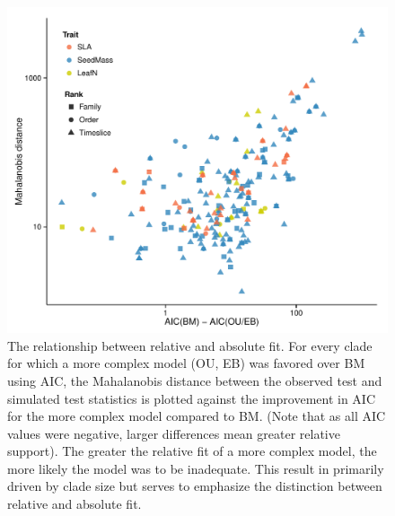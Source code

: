 \documentclass[a4paper,11pt]{article}
\begin{document}
{\begin{figure}[p]
  \centering
  \includegraphics[scale=0.8]{figs/ad-aic}
  \caption{The relationship between relative and absolute fit. For every clade for which a more complex model (OU, EB) was favored over BM using AIC, the Mahalanobis distance between the observed test and simulated test statistics is plotted against the improvement in AIC for the more complex model compared to BM. (Note that as all AIC values were negative, larger differences mean greater relative support). The greater the relative fit of a more complex model, the more likely the model was to be inadequate. This result in primarily driven by clade size but serves to emphasize the distinction between relative and absolute fit.}
  \label{fig:supp-ad-aic}
\end{figure} 

}
\end{document}
